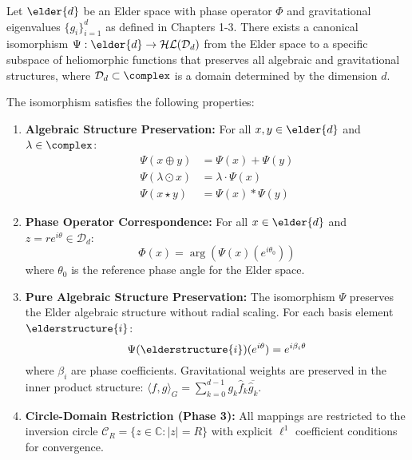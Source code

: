 \begin{theorem}
\label{thm:elder_heliomorphic_isomorphism}
Let $\elder{d}$ be an Elder space with phase operator $\Phi$ and gravitational eigenvalues $\{g_i\}_{i=1}^d$ as defined in Chapters 1-3. There exists a canonical isomorphism $\Psi: \elder{d} \rightarrow \mathcal{HL}(\mathcal{D}_d)$ from the Elder space to a specific subspace of heliomorphic functions that preserves all algebraic and gravitational structures, where $\mathcal{D}_d \subset \complex$ is a domain determined by the dimension $d$.

The isomorphism satisfies the following properties:
\begin{enumerate}
    \item \textbf{Algebraic Structure Preservation:} For all $x, y \in \elder{d}$ and $\lambda \in \complex$:
    \begin{align}
        \Psi(x \oplus y) &= \Psi(x) + \Psi(y) \\
        \Psi(\lambda \odot x) &= \lambda \cdot \Psi(x) \\
        \Psi(x \star y) &= \Psi(x) * \Psi(y)
    \end{align}
    
    \item \textbf{Phase Operator Correspondence:} For all $x \in \elder{d}$ and $z = re^{i\theta} \in \mathcal{D}_d$:
    \begin{equation}
        \Phi(x) = \arg(\Psi(x)(e^{i\theta_0}))
    \end{equation}
    where $\theta_0$ is the reference phase angle for the Elder space.
    
    \item \textbf{Pure Algebraic Structure Preservation:} The isomorphism $\Psi$ preserves the Elder algebraic structure without radial scaling. For each basis element $\elderstructure{i}$:
    \begin{equation}
        \Psi(\elderstructure{i})(e^{i\theta}) = e^{i\beta_i\theta}
    \end{equation}
    where $\beta_i$ are phase coefficients. Gravitational weights are preserved in the inner product structure: $\langle f, g \rangle_G = \sum_{k=0}^{d-1} g_k \hat{f}_k \overline{\hat{g}_k}$.
    
    \item \textbf{Circle-Domain Restriction (Phase 3):} All mappings are restricted to the inversion circle $\mathcal{C}_R = \{z \in \mathbb{C} : |z| = R\}$ with explicit $\ell^1$ coefficient conditions for convergence.
\end{enumerate}
\end{theorem}

